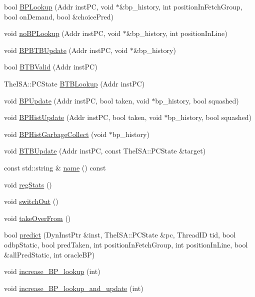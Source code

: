 \begin{DoxyCompactItemize}
bool \hyperlink{classBPredUnit_aafefe8c8d85f49d118e825fa0c1c0176}{BPLookup} (Addr instPC, void $\ast$\&bp\_\-history, int positionInFetchGroup, bool onDemand, bool \&choicePred)
\item 
void \hyperlink{classBPredUnit_af5b3e6db0cf1f00dee290e16765f28f8}{noBPLookup} (Addr instPC, void $\ast$\&bp\_\-history, int positionInLine)
\item 
void \hyperlink{classBPredUnit_a55a6608f958c4e70360c34bd48c57032}{BPBTBUpdate} (Addr instPC, void $\ast$\&bp\_\-history)
\item 
bool \hyperlink{classBPredUnit_a66a1f6f9cdd28b38b005a666a9976ed7}{BTBValid} (Addr instPC)
\item 
TheISA::PCState \hyperlink{classBPredUnit_a31024f2d92bfd7e778a790f4c6f61498}{BTBLookup} (Addr instPC)
\item 
void \hyperlink{classBPredUnit_a35c57ae0661f1d5dd2169e919741d47b}{BPUpdate} (Addr instPC, bool taken, void $\ast$bp\_\-history, bool squashed)
\item 
void \hyperlink{classBPredUnit_a16de9793a28ee07dcf26d89c03328555}{BPHistUpdate} (Addr instPC, bool taken, void $\ast$bp\_\-history, bool squashed)
\item 
void \hyperlink{classBPredUnit_a9268abcbddfdfd6e6a076ecd343a3de5}{BPHistGarbageCollect} (void $\ast$bp\_\-history)
\item 
void \hyperlink{classBPredUnit_a5afe025cde23c608d745e8daca63e8a6}{BTBUpdate} (Addr instPC, const TheISA::PCState \&target)
\item 
const std::string \& \hyperlink{classBPredUnit_aeaaeb15f110f0ed58cc3161d6f6ace22}{name} () const 
\item 
void \hyperlink{classBPredUnit_a0cffcea165538b2e7fd554a92b8d9b85}{regStats} ()
\item 
void \hyperlink{classBPredUnit_ac33c3d29c7b6aca9578fc416eb34e60e}{switchOut} ()
\item 
void \hyperlink{classBPredUnit_a9011bcc9143d2396dfec49828484a645}{takeOverFrom} ()
\item 
bool \hyperlink{classBPredUnit_add836c4a521ed2bd12eca4d1dee13620}{predict} (DynInstPtr \&inst, TheISA::PCState \&pc, ThreadID tid, bool odbpStatic, bool predTaken, int positionInFetchGroup, int positionInLine, bool \&allPredStatic, int oracleBP)
\item 
void \hyperlink{classBPredUnit_a89690e897bb5661ee868f659a06515c9}{increase\_\-BP\_\-lookup} (int)
\item 
void \hyperlink{classBPredUnit_a471a1acb994d07a6d57b2f39ce56e6a4}{increase\_\-BP\_\-lookup\_\-and\_\-update} (int)

\end{DoxyCompactItemize}
